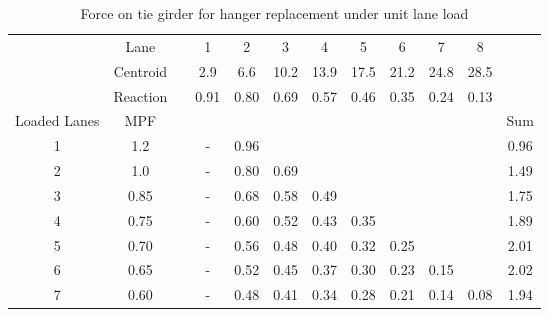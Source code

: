 \begin{table}[H]
\centering
\caption{Force on tie girder for hanger replacement under unit lane load}
\label{tab:app_ll_hanger_replacement}
\begin{tabular}{cccccccccccc}
\cline{2-11}
             & Lane     &  & 1    & 2    & 3    & 4    & 5    & 6    & 7    & 8    &      \\
             & Centroid &  & 2.9  & 6.6  & 10.2 & 13.9 & 17.5 & 21.2 & 24.8 & 28.5 &      \\
             & Reaction &  & 0.91 & 0.80 & 0.69 & 0.57 & 0.46 & 0.35 & 0.24 & 0.13 &      \\ \hline
Loaded Lanes & MPF      &  &      &      &      &      &      &      &      &      & Sum  \\ \hline
1            & 1.2      &  & -    & 0.96 &      &      &      &      &      &      & 0.96 \\
2            & 1.0      &  & -    & 0.80 & 0.69 &      &      &      &      &      & 1.49 \\
3            & 0.85     &  & -    & 0.68 & 0.58 & 0.49 &      &      &      &      & 1.75 \\
4            & 0.75     &  & -    & 0.60 & 0.52 & 0.43 & 0.35 &      &      &      & 1.89 \\
5            & 0.70     &  & -    & 0.56 & 0.48 & 0.40 & 0.32 & 0.25 &      &      & 2.01 \\
6            & 0.65     &  & -    & 0.52 & 0.45 & 0.37 & 0.30 & 0.23 & 0.15 &      & 2.02 \\
7            & 0.60     &  & -    & 0.48 & 0.41 & 0.34 & 0.28 & 0.21 & 0.14 & 0.08 & 1.94 \\ \hline
\end{tabular}
\end{table}